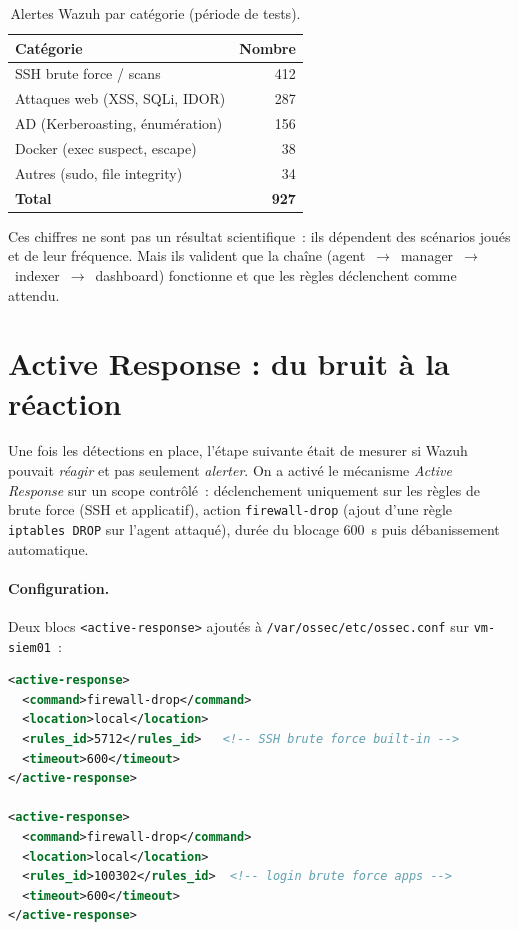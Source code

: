 \begin{table}[h]
\centering
\caption{Alertes Wazuh par catégorie (période de tests).}
\label{tab:alertes}
\small
\begin{tabular}{lr}
\toprule
\textbf{Catégorie} & \textbf{Nombre} \\
\midrule
SSH brute force / scans & 412 \\
Attaques web (XSS, SQLi, IDOR) & 287 \\
AD (Kerberoasting, énumération) & 156 \\
Docker (exec suspect, escape) & 38 \\
Autres (sudo, file integrity) & 34 \\
\midrule
\textbf{Total} & \textbf{927} \\
\bottomrule
\end{tabular}
\end{table}

Ces chiffres ne sont pas un résultat scientifique~: ils dépendent
des scénarios joués et de leur fréquence. Mais ils valident que
la chaîne (agent~$\to$~manager~$\to$~indexer~$\to$~dashboard) fonctionne et
que les règles déclenchent comme attendu.

\section{Active Response : du bruit à la réaction}
\label{sec:active-response}

Une fois les détections en place, l'étape suivante était de
mesurer si Wazuh pouvait \emph{réagir} et pas seulement
\emph{alerter}. On a activé le mécanisme \emph{Active Response}
sur un scope contrôlé~: déclenchement uniquement sur les règles
de brute force (SSH et applicatif), action \texttt{firewall-drop}
(ajout d'une règle \texttt{iptables DROP} sur l'agent attaqué),
durée du blocage 600~s puis débanissement automatique.

\paragraph{Configuration.} Deux blocs \texttt{<active-response>}
ajoutés à \texttt{/var/ossec/etc/ossec.conf} sur
\texttt{vm-siem01}~:

\begin{lstlisting}[language=XML,caption={Réponse active sur
brute force SSH et applicatif.}]
<active-response>
  <command>firewall-drop</command>
  <location>local</location>
  <rules_id>5712</rules_id>   <!-- SSH brute force built-in -->
  <timeout>600</timeout>
</active-response>

<active-response>
  <command>firewall-drop</command>
  <location>local</location>
  <rules_id>100302</rules_id>  <!-- login brute force apps -->
  <timeout>600</timeout>
</active-response>
\end{lstlisting}

